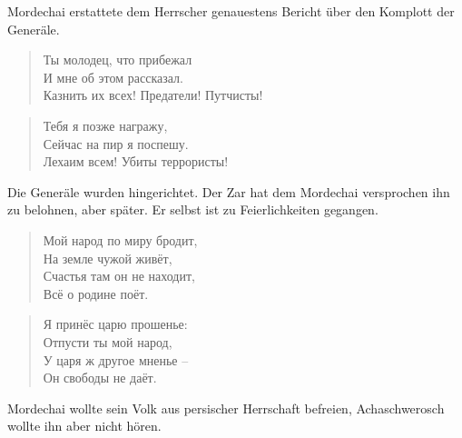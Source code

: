 \documentclass[12pt,a4paper,titlepage]{article}
\begin{document}
\begin{drama}
\uespeaks
Mordechai erstattete dem Herrscher genauestens Bericht über den Komplott der Generäle.

\ahspeaks {}
\begin{verse}
Ты молодец, что прибежал\\
И мне об этом рассказал.\\
Казнить их всех! Предатели! Путчисты!\\
\end{verse}

\begin{verse}
Тебя я позже награжу,\\
Сейчас на пир я поспешу.\\
Лехаим всем! Убиты террористы!\\
\end{verse}


\uespeaks
Die Generäle wurden hingerichtet. Der Zar hat dem Mordechai versprochen ihn zu belohnen,
aber später. Er selbst ist zu Feierlichkeiten gegangen.



\scene

\mspeaks {}
\begin{verse}
Мой народ по миру бродит,\\
На земле чужой живёт,\\
Счастья там он не находит,\\
Всё о родине поёт.\\
\end{verse}

\begin{verse}
Я принёс царю прошенье:\\
Отпусти ты мой народ,\\
У царя ж другое мненье --\\
Он свободы не даёт.\\
\end{verse}

\uespeaks
Mordechai wollte sein Volk aus persischer Herrschaft befreien,
Achaschwerosch wollte ihn aber nicht hören.


\scene



\end{drama}
\end{document}
